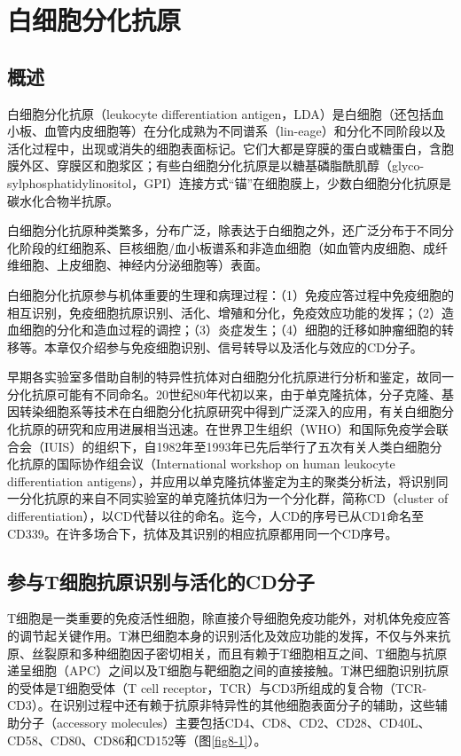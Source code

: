 \section{白细胞分化抗原}


\subsection{概述}

白细胞分化抗原（leukocyte differentiation
antigen，LDA）是白细胞（还包括血小板、血管内皮细胞等）在分化成熟为不同谱系（lin-eage）和分化不同阶段以及活化过程中，出现或消失的细胞表面标记。它们大都是穿膜的蛋白或糖蛋白，含胞膜外区、穿膜区和胞浆区；有些白细胞分化抗原是以糖基磷脂酰肌醇（glyco-sylphosphatidylinositol，GPI）连接方式“锚”在细胞膜上，少数白细胞分化抗原是碳水化合物半抗原。

白细胞分化抗原种类繁多，分布广泛，除表达于白细胞之外，还广泛分布于不同分化阶段的红细胞系、巨核细胞/血小板谱系和非造血细胞（如血管内皮细胞、成纤维细胞、上皮细胞、神经内分泌细胞等）表面。

白细胞分化抗原参与机体重要的生理和病理过程：（1）免疫应答过程中免疫细胞的相互识别，免疫细胞抗原识别、活化、增殖和分化，免疫效应功能的发挥；（2）造血细胞的分化和造血过程的调控；（3）炎症发生；（4）细胞的迁移如肿瘤细胞的转移等。本章仅介绍参与免疫细胞识别、信号转导以及活化与效应的CD分子。

早期各实验室多借助自制的特异性抗体对白细胞分化抗原进行分析和鉴定，故同一分化抗原可能有不同命名。20世纪80年代初以来，由于单克隆抗体，分子克隆、基因转染细胞系等技术在白细胞分化抗原研究中得到广泛深入的应用，有关白细胞分化抗原的研究和应用进展相当迅速。在世界卫生组织（WHO）和国际免疫学会联合会（IUIS）的组织下，自1982年至1993年已先后举行了五次有关人类白细胞分化抗原的国际协作组会议（International
workshop on human leukocyte differentiation
antigens），并应用以单克隆抗体鉴定为主的聚类分析法，将识别同一分化抗原的来自不同实验室的单克隆抗体归为一个分化群，简称CD（cluster
of
differentiation），以CD代替以往的命名。迄今，人CD的序号已从CD1命名至CD339。在许多场合下，抗体及其识别的相应抗原都用同一个CD序号。


\subsection{参与T细胞抗原识别与活化的CD分子}

T细胞是一类重要的免疫活性细胞，除直接介导细胞免疫功能外，对机体免疫应答的调节起关键作用。T淋巴细胞本身的识别活化及效应功能的发挥，不仅与外来抗原、丝裂原和多种细胞因子密切相关，而且有赖于T细胞相互之间、T细胞与抗原递呈细胞（APC）之间以及T细胞与靶细胞之间的直接接触。T淋巴细胞识别抗原的受体是T细胞受体（T
cell
receptor，TCR）与CD3所组成的复合物（TCR-CD3）。在识别过程中还有赖于抗原非特异性的其他细胞表面分子的辅助，这些辅助分子（accessory
molecules）主要包括CD4、CD8、CD2、CD28、CD40L、CD58、CD80、CD86和CD152等（图\ref{fig8-1}）。

